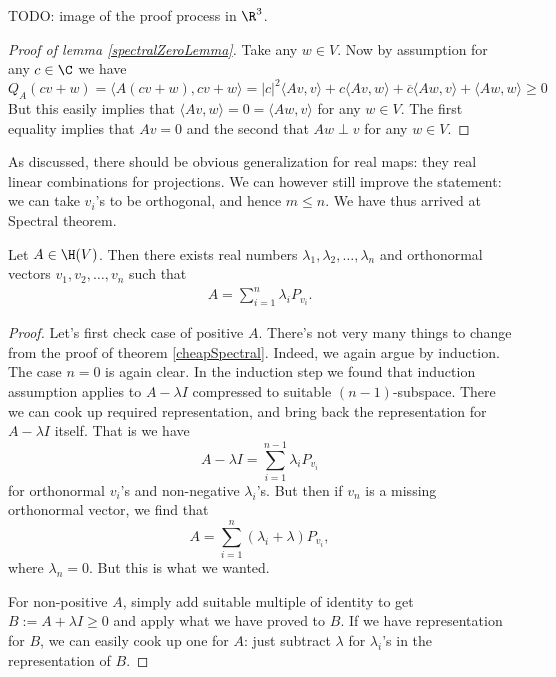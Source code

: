 TODO: image of the proof process in $\R^{3}$.

\begin{proof}[Proof of lemma \ref{spectralZeroLemma}]
	Take any $w \in V$. Now by assumption for any $c \in \C$ we have
	\[
		Q_{A}(c v + w) = \langle A (c v + w), c v + w \rangle = |c|^{2} \langle A v, v \rangle + c \langle A v, w \rangle + \overline{c} \langle A w, v \rangle + \langle A w, w \rangle \geq 0
	\]
	But this easily implies that $\langle A v, w \rangle = 0 = \langle A w, v \rangle$ for any $w \in V$. The first equality implies that $A v = 0$ and the second that $A w \perp v$ for any $w \in V$.
\end{proof}

As discussed, there should be obvious generalization for real maps: they real linear combinations for projections. We can however still improve the statement: we can take $v_{i}$'s to be orthogonal, and hence $m \leq n$. We have thus arrived at Spectral theorem.

\begin{lause}
	Let $A \in \H(V)$. Then there exists real numbers $\lambda_{1}, \lambda_{2}, \ldots, \lambda_{n}$ and orthonormal vectors $v_{1}, v_{2}, \ldots, v_{n}$ such that
	\begin{align}\label{spectralrepr}
		A = \sum_{i = 1}^{n} \lambda_{i} P_{v_{i}}.
	\end{align}
\end{lause}
\begin{proof}
	Let's first check case of positive $A$. There's not very many things to change from the proof of theorem \ref{cheapSpectral}. Indeed, we again argue by induction. The case $n = 0$ is again clear. In the induction step we found that induction assumption applies to $A - \lambda I$ compressed to suitable $(n - 1)$-subspace. There we can cook up required representation, and bring back the representation for $A - \lambda I$ itself. That is we have
	\[
		A - \lambda I = \sum_{i = 1}^{n - 1} \lambda_{i} P_{v_{i}}
	\]
	for orthonormal $v_{i}$'s and non-negative $\lambda_{i}$'s. But then if $v_{n}$ is a missing orthonormal vector, we find that
	\[
		A = \sum_{i = 1}^{n} (\lambda_{i} + \lambda) P_{v_{i}},
	\]
	where $\lambda_{n} = 0$. But this is what we wanted.

	For non-positive $A$, simply add suitable multiple of identity to get $B := A + \lambda I \geq 0$ and apply what we have proved to $B$. If we have representation for $B$, we can easily cook up one for $A$: just subtract $\lambda$ for $\lambda_{i}$'s in the representation of $B$.
\end{proof}

